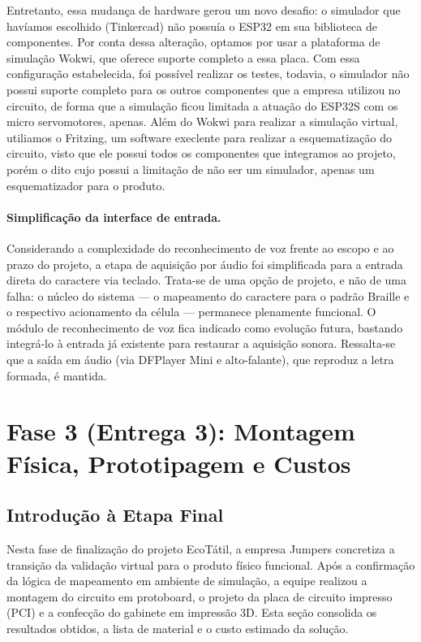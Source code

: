 \documentclass[12pt, a4paper]{article}
\begin{document}
Entretanto, essa mudança de hardware gerou um novo desafio: o simulador que havíamos escolhido (Tinkercad) não possuía o ESP32 em sua biblioteca de componentes. Por conta dessa alteração, optamos por usar a plataforma de simulação Wokwi, que oferece suporte completo a essa placa. Com essa configuração estabelecida, foi possível realizar os testes, todavia, o simulador não possui suporte completo para os outros componentes que a empresa utilizou no circuito, de forma que a simulação ficou limitada a atuação do ESP32S com os micro servomotores, apenas. Além do Wokwi para realizar a simulação virtual, utiliamos o Fritzing, um software execlente para realizar  a esquematização do circuito, visto que ele possui todos os componentes que integramos ao projeto, porém o dito cujo possui a limitação de não ser um simulador, apenas um esquematizador para o produto.

\paragraph{Simplificação da interface de entrada.} Considerando a complexidade do reconhecimento de voz frente ao escopo e ao prazo do projeto, a etapa de aquisição por áudio foi simplificada para a entrada direta do caractere via teclado. Trata-se de uma opção de projeto, e não de uma falha: o núcleo do sistema --- o mapeamento do caractere para o padrão Braille e o respectivo acionamento da célula --- permanece plenamente funcional. O módulo de reconhecimento de voz fica indicado como evolução futura, bastando integrá-lo à entrada já existente para restaurar a aquisição sonora. Ressalta-se que a saída em áudio (via DFPlayer Mini e alto-falante), que reproduz a letra formada, é mantida.


\newpage
\section{Fase 3 (Entrega 3): Montagem Física, Prototipagem e Custos}

\subsection{Introdução à Etapa Final}
Nesta fase de finalização do projeto EcoTátil, a empresa Jumpers concretiza a transição da validação virtual para o produto físico funcional. Após a confirmação da lógica de mapeamento em ambiente de simulação, a equipe realizou a montagem do circuito em protoboard, o projeto da placa de circuito impresso (PCI) e a confecção do gabinete em impressão 3D. Esta seção consolida os resultados obtidos, a lista de material e o custo estimado da solução.
\end{document}
